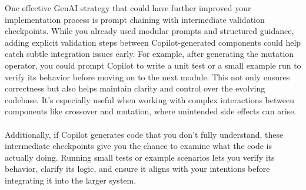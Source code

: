 \documentclass[a4paper,10pt]{article}
\begin{document}
One effective GenAI strategy that could have further improved your implementation process is prompt chaining with intermediate validation checkpoints. While you already used modular prompts and structured guidance, adding explicit validation steps between Copilot-generated components could help catch subtle integration issues early. For example, after generating the mutation operator, you could prompt Copilot to write a unit test or a small example run to verify its behavior before moving on to the next module. This not only ensures correctness but also helps maintain clarity and control over the evolving codebase. It's especially useful when working with complex interactions between components like crossover and mutation, where unintended side effects can arise.
\\\\
\noindent
Additionally, if Copilot generates code that you don't fully understand, these intermediate checkpoints give you the chance to examine what the code is actually doing. Running small tests or example scenarios lets you verify its behavior, clarify its logic, and ensure it aligns with your intentions before integrating it into the larger system.
\end{document}
